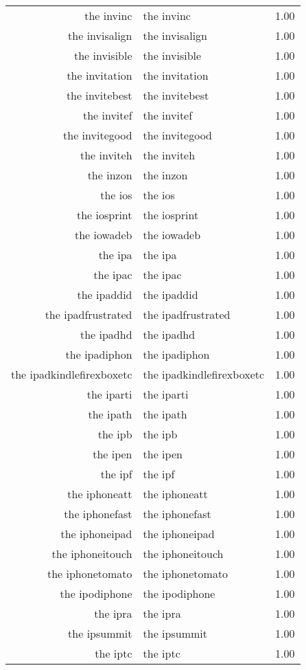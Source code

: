 \begin{table}[ht]
\begin{tabular}{rlr}
  the invinc & the invinc & 1.00 \\ 
  the invisalign & the invisalign & 1.00 \\ 
  the invisible & the invisible & 1.00 \\ 
  the invitation & the invitation & 1.00 \\ 
  the invitebest & the invitebest & 1.00 \\ 
  the invitef & the invitef & 1.00 \\ 
  the invitegood & the invitegood & 1.00 \\ 
  the inviteh & the inviteh & 1.00 \\ 
  the inzon & the inzon & 1.00 \\ 
  the ios & the ios & 1.00 \\ 
  the iosprint & the iosprint & 1.00 \\ 
  the iowadeb & the iowadeb & 1.00 \\ 
  the ipa & the ipa & 1.00 \\ 
  the ipac & the ipac & 1.00 \\ 
  the ipaddid & the ipaddid & 1.00 \\ 
  the ipadfrustrated & the ipadfrustrated & 1.00 \\ 
  the ipadhd & the ipadhd & 1.00 \\ 
  the ipadiphon & the ipadiphon & 1.00 \\ 
  the ipadkindlefirexboxetc & the ipadkindlefirexboxetc & 1.00 \\ 
  the iparti & the iparti & 1.00 \\ 
  the ipath & the ipath & 1.00 \\ 
  the ipb & the ipb & 1.00 \\ 
  the ipen & the ipen & 1.00 \\ 
  the ipf & the ipf & 1.00 \\ 
  the iphoneatt & the iphoneatt & 1.00 \\ 
  the iphonefast & the iphonefast & 1.00 \\ 
  the iphoneipad & the iphoneipad & 1.00 \\ 
  the iphoneitouch & the iphoneitouch & 1.00 \\ 
  the iphonetomato & the iphonetomato & 1.00 \\ 
  the ipodiphone & the ipodiphone & 1.00 \\ 
  the ipra & the ipra & 1.00 \\ 
  the ipsummit & the ipsummit & 1.00 \\ 
  the iptc & the iptc & 1.00 \\ 

\end{tabular}
\end{table}

